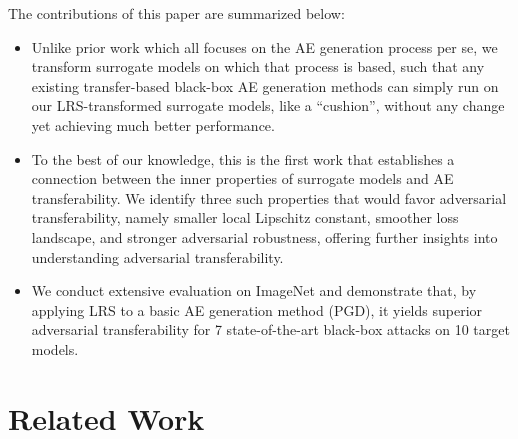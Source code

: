 \documentclass[letterpaper]{article} %
\theoremstyle{plain}
\theoremstyle{definition}
\begin{document}
The contributions of this paper are summarized below:

\begin{itemize}

    \item Unlike prior work which all focuses on the AE generation process per se, we transform surrogate models on which that process is based, such that any existing transfer-based black-box AE generation methods can simply run on our LRS-transformed surrogate models, like a ``cushion'', without any change yet achieving much better performance.

    \item To the best of our knowledge, this is the first work that establishes a connection between the inner properties of surrogate models and AE transferability. We identify three such properties that would favor adversarial transferability, namely smaller local Lipschitz constant, smoother loss landscape, and stronger adversarial robustness, offering further insights into understanding adversarial transferability.

    \item We conduct extensive evaluation on ImageNet and demonstrate that, by applying LRS to a basic AE generation method (PGD), it yields superior adversarial transferability for 7 state-of-the-art black-box attacks on 10 target models.
\end{itemize}

\section{Related Work}
\end{document}
